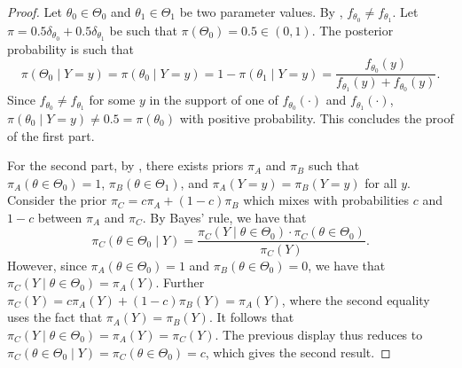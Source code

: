\documentclass[12pt,reqno]{amsart}
\theoremstyle{theorem}
\theoremstyle{definition}
\newcommand{\0}{\mathbf{0}}
\newcommand{\1}{\mathbf{1}}
\begin{document}
\begin{proof}
    Let $\theta_0 \in \Theta_0$ and $\theta_1 \in \Theta_1$ be two parameter values. By
    , $f_{\theta_0} \neq f_{\theta_1}$. Let $\pi = 0.5 \delta_{\theta_0} +
    0.5 \delta_{\theta_1}$ be such that $\pi(\Theta_0) = 0.5 \in (0,1)$. The posterior
    probability is such that \[
        \pi(\Theta_0 \mid Y=y) = \pi(\theta_0 \mid Y=y) = 1-\pi(\theta_1 \mid Y=y) = \frac{f_{\theta_0}(y)}{f_
        {\theta_1}(y) + f_{\theta_0}(y)}.
    \]
    Since $f_{\theta_0} \neq f_{\theta_1}$ for some $y$ in the support of one of $f_
    {\theta_0}(\cdot)$ and $f_{\theta_1}(\cdot)$, $\pi(\theta_0 \mid Y=y) \neq 0.5 = \pi
    (\theta_0)$ with positive probability. This concludes the proof of the first part.
    
    For the second part, by , there exists priors $\pi_A$ and $\pi_B$ such that $\pi_A(\theta \in \Theta_0) = 1$, $\pi_B(\theta \in \Theta_1)$, and $\pi_A(Y =y) = \pi_B(Y =y)$ for all $y$. Consider the prior $\pi_C = c \pi_A + (1-c) \pi_B$ which mixes with probabilities $c$ and $1-c$ between $\pi_A$ and $\pi_C$. By Bayes' rule, we have that 
$$\pi_C(\theta \in \Theta_0 \mid Y) = \dfrac{\pi_C(Y \mid \theta \in \Theta_0) \cdot  \pi_C(\theta \in \Theta_0)}{\pi_C(Y)} . $$
\noindent However, since $\pi_A(\theta \in \Theta_0) = 1$ and $\pi_B(\theta \in \Theta_0) = 0$, we have that $\pi_C(Y \mid \theta \in \Theta_0) = \pi_A(Y)$. Further $\pi_C(Y) = c \pi_A(Y) + (1-c) \pi_B(Y) = \pi_A(Y)$, where the second equality uses the fact that $\pi_A(Y) = \pi_B(Y)$. It follows that $\pi_C(Y \mid \theta \in \Theta_0) = \pi_A(Y) = \pi_C(Y)$. The previous display thus reduces to $\pi_C(\theta \in \Theta_0 \mid Y) = \pi_C(\theta \in \Theta_0) =c$, which gives the second result.

    
\end{proof}
\end{document}
